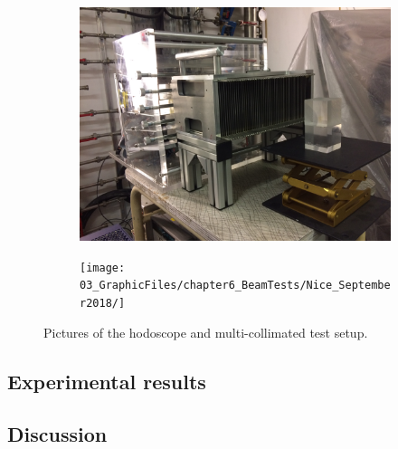 \begin{figure}[!htbp]
\begin{subfigure}[t]{.5\textwidth}
\centering
\includegraphics[width=1.\textwidth]{03_GraphicFiles/chapter6_BeamTests/Nice_September2018/Target_Coll_Abs.jpg}
\caption{}
\label{chap6::fig::September_SetupPicture}
\end{subfigure}
\begin{subfigure}[t]{.5\textwidth}
\centering
\texttt{[image: 03\_GraphicFiles/chapter6\_BeamTests/Nice\_September2018/]}	
\caption{}
\label{chap6::fig::September_SetupPicture2}
\end{subfigure}
\caption{Pictures of the hodoscope and multi-collimated test setup.}
\label{chap6::fig::September_SetupCamera}
\end{figure}


\subsection{Experimental results}\label{chap6::subsec::mayResults} 

\subsection{Discussion}\label{chap6::subsec::mayDiscussion} 

\clearpage
